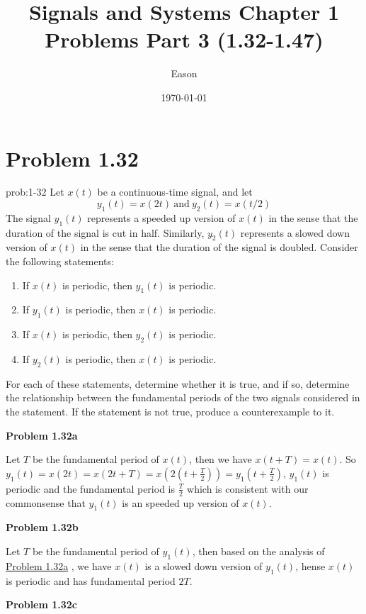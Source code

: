 \documentclass[koma,a4paper,utopia,12pt,listings-color,microtype,paralist,colorlinks,urlcolor=red]{org-article}
\author{Eason}
\date{\today}
\title{Signals and Systems Chapter 1 Problems Part 3 (1.32-1.47)}
\begin{document}
\section{Problem 1.32}
\label{sec:org919e435}


\begin{prob}[]{prob:1-32}
Let \(x(t)\) be a continuous-time signal, and let
\begin{equation*}
y_{1}(t) = x(2t) \ \mathrm{and} \ y_{2}(t) = x(t/2)
\end{equation*}
The signal \(y_{1}(t)\) represents a speeded up version of \(x(t)\) in the
sense that the duration of the signal is cut in half. Similarly,
\(y_{2}(t)\) represents a slowed down version of \(x(t)\) in the sense that
the duration of the signal is doubled. Consider the following statements:

\begin{enumerate}
\item If \(x(t)\) is periodic, then \(y_{1}(t)\) is periodic.
\item If \(y_{1}(t)\) is periodic, then \(x(t)\) is periodic.
\item If \(x(t)\) is periodic, then \(y_{2}(t)\) is periodic.
\item If \(y_{2}(t)\) is periodic, then \(x(t)\) is periodic.
\end{enumerate}

For each of these statements, determine whether it is true, and if so,
determine the relationship between the fundamental periods of the two
signals considered in the statement. If the statement is not true, produce a
counterexample to it.
\label{prob:1-32}
\end{prob}

\textbf{Problem 1.32a} \label{Problem 1.32a}

Let \(T\) be the fundamental period of \(x(t)\), then we have \(x(t+T) = x(t)\).
So \(y_{1}(t) = x(2t) = x(2t + T) = x(2(t+ \frac{T}{2} ))=
y_{1}(t+\frac{T}{2})\), \(y_{1}(t)\) is periodic and the fundamental period is
\(\frac{T}{2}\) which is consistent with our commonsense that \(y_{1}(t)\) is an
speeded up version of \(x(t)\).

\textbf{Problem 1.32b}

Let \(T\) be the fundamental period of \(y_{1}(t)\), then based on the analysis
of \hyperref[Problem 1.32a]{Problem 1.32a} , we have \(x(t)\) is a slowed down version of \(y_{1}(t)\),
hense \(x(t)\) is periodic and has fundamental period \(2T\).

\textbf{Problem 1.32c} \label{Problem 1.32c}
\end{document}
